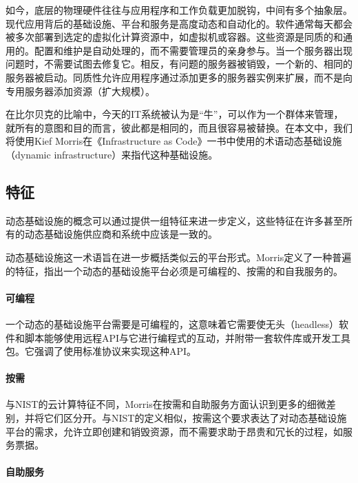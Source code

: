\documentclass[macfonts,master]{njuthesis}
\begin{document}
如今，底层的物理硬件往往与应用程序和工作负载更加脱钩，中间有多个抽象层。现代应用背后的基础设施、平台和服务是高度动态和自动化的。软件通常每天都会被多次部署到选定的虚拟化计算资源中，如虚拟机或容器。这些资源是同质的和通用的\cite{morris2016infrastructure}。配置和维护是自动处理的，而不需要管理员的亲身参与。当一个服务器出现问题时，不需要试图去修复它。相反，有问题的服务器被销毁，一个新的、相同的服务器被启动。同质性允许应用程序通过添加更多的服务器实例来扩展，而不是向专用服务器添加资源（扩大规模）\cite{morris2016infrastructure}。

在比尔贝克的比喻中，今天的IT系统被认为是``牛''，可以作为一个群体来管理，就所有的意图和目的而言，彼此都是相同的，而且很容易被替换。在本文中，我们将使用Kief Morris在《Infrastructure as Code》一书中使用的术语动态基础设施（dynamic infrastructure）来指代这种基础设施\cite{morris2016infrastructure}。

\subsection{特征}

动态基础设施的概念可以通过提供一组特征来进一步定义，这些特征在许多甚至所有的动态基础设施供应商和系统中应该是一致的。

动态基础设施这一术语旨在进一步概括类似云的平台形式。Morris定义了一种普遍的特征，指出一个动态的基础设施平台必须是可编程的、按需的和自我服务的\cite{morris2016infrastructure}。

\paragraph{可编程}

一个动态的基础设施平台需要是可编程的，这意味着它需要使无头（headless）软件和脚本能够使用远程API与它进行编程式的互动，并附带一套软件库或开发工具包\cite{morris2016infrastructure}。它强调了使用标准协议来实现这种API。

\paragraph{按需}

与NIST的云计算特征不同，Morris在按需和自助服务方面认识到更多的细微差别，并将它们区分开。与NIST的定义相似，按需这个要求表达了对动态基础设施平台的需求，允许立即创建和销毁资源，而不需要求助于昂贵和冗长的过程，如服务票据\cite{morris2016infrastructure}。

\paragraph{自助服务}
\end{document}
